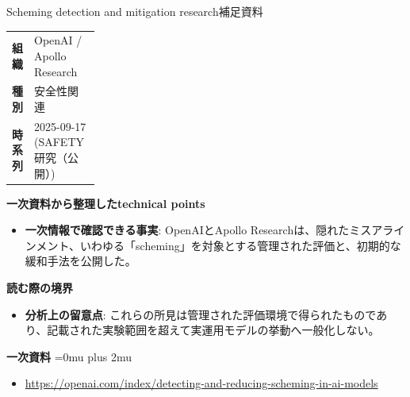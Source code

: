 \begin{technicalnote}{Scheming detection and mitigation research}{補足資料}
\begingroup
\begin{tabularx}{\linewidth}{@{}>{\bfseries}p{0.22\linewidth}X@{}}
組織 & OpenAI / Apollo Research \\
種別 & 安全性関連 \\
時系列 & 2025-09-17 (SAFETY 研究（公開）) \\
\end{tabularx}
\smallskip
{\bfseries 一次資料から整理したtechnical points}
\begin{itemize}[leftmargin=1.5em,itemsep=0.35em]
\item \textbf{一次情報で確認できる事実}: OpenAIとApollo Researchは、隠れたミスアラインメント、いわゆる「scheming」を対象とする管理された評価と、初期的な緩和手法を公開した。
\end{itemize}
\begin{minipage}{\linewidth}
{\bfseries 読む際の境界}
\begin{itemize}[leftmargin=1.5em,itemsep=0.35em]
\item \textbf{分析上の留意点}: これらの所見は管理された評価環境で得られたものであり、記載された実験範囲を超えて実運用モデルの挙動へ一般化しない。
\end{itemize}
\begin{samepage}
{\bfseries 一次資料}
\begingroup\sloppy
\Urlmuskip=0mu plus 2mu\relax
\begin{itemize}[leftmargin=1.5em,itemsep=0.25em]
\item {\scriptsize\url{https://openai.com/index/detecting-and-reducing-scheming-in-ai-models}}
\end{itemize}
\endgroup
\end{samepage}
\end{minipage}
\endgroup
\end{technicalnote}
\medskip
